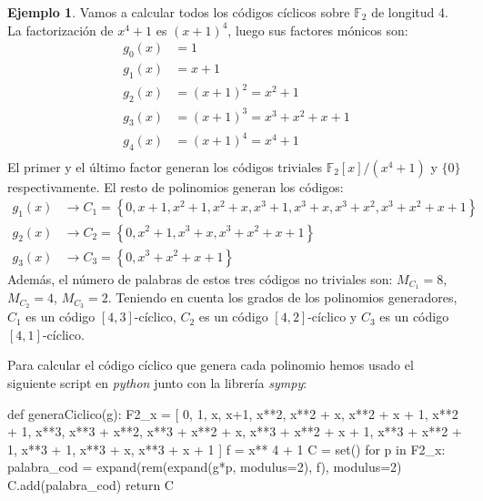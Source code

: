 \documentclass[a4paper,11pt]{article}
\numberwithin{equation}{section}
\theoremstyle{definition} %
\newtheorem{ejemplo}{Ejemplo}[section]
\begin{document}
    \begin{ejemplo}
        Vamos a calcular todos los códigos cíclicos sobre $\mathbb{F}_2$ de longitud 4. La factorización de $x^4 + 1$ es $(x + 1)^4$, luego sus factores mónicos son:
        \begin{align*}
            g_0(x) &= 1 \\
            g_1(x) &= x + 1 \\
            g_2(x) &= (x + 1)^2 = x^2 + 1 \\
            g_3(x) &= (x + 1)^3 = x^3 + x^2 + x + 1 \\
            g_4(x) &= (x + 1)^4 = x^4 + 1 \\
        \end{align*}
        El primer y el último factor generan los códigos triviales $\mathbb{F}_2[x]/(x^4 + 1)$ y $\{0\}$ respectivamente. El resto de polinomios generan los códigos:
        \begin{align*}
            g_1(x) &\rightarrow C_1 = \left\{0, x + 1, x^{2} + 1, x^{2} + x, x^{3} + 1, x^{3} + x, x^{3} + x^{2}, x^{3} + x^{2} + x + 1\right\} \\
            g_2(x) &\rightarrow C_2 = \left\{0, x^{2} + 1, x^{3} + x, x^{3} + x^{2} + x + 1\right\} \\
            g_3(x) &\rightarrow C_3 = \left\{0, x^{3} + x^{2} + x + 1\right\}
        \end{align*}
        Además, el número de palabras de estos tres códigos no triviales son: $M_{C_1} = 8$, $M_{C_2} = 4$, $M_{C_3} = 2$. Teniendo en cuenta los grados de los polinomios generadores, $C_1$ es un código $[4, 3]$-cíclico, $C_2$ es un código $[4, 2]$-cíclico y $C_3$ es un código $[4, 1]$-cíclico.

        Para calcular el código cíclico que genera cada polinomio hemos usado el siguiente script en \emph{python} junto con la librería \emph{sympy}:
        \begin{pythoncode}
        def generaCiclico(g):
            F2_x = [
                0, 1, x, x+1, x**2, x**2 + x, x**2 + x + 1, x**2 + 1, x**3,
                x**3 + x**2, x**3 + x**2 + x, x**3 + x**2 + x + 1,
                x**3 + x**2 + 1, x**3 + 1, x**3 + x, x**3 + x + 1
            ]
            f = x** 4 + 1
            C = set()
            for p in F2_x:
                palabra_cod = expand(rem(expand(g*p, modulus=2), f), modulus=2)
                C.add(palabra_cod)
            return C
        \end{pythoncode}
    \end{ejemplo}
\end{document}
